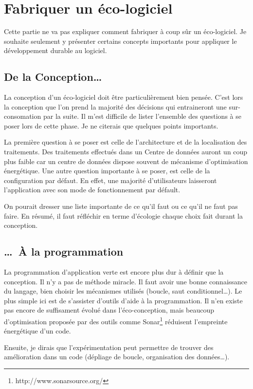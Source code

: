 \documentclass[a4paper, 11pt]{report}
\begin{document}
	\section{Fabriquer un éco-logiciel}
Cette partie ne va pas expliquer comment fabriquer à coup sûr un éco-logiciel. Je souhaite seulement y présenter certains concepts importants pour appliquer le développement durable au logiciel.
		\subsection{De la Conception\ldots}
La conception d'un éco-logiciel doit être particulièrement bien pensée. C'est lors la conception que l'on prend la majorité des décisions qui entraineront une sur-consomation par la suite. Il m'est difficile de lister l'ensemble des questions à se poser lors de cette phase. Je ne citerais que quelques points importants.

La première question à se poser est celle de l'architecture et de la localisation des traitements\cite{EcoLogiciels}. Des traitements effectués dans un Centre de données auront un coup plus faible car un centre de données dispose souvent de mécanisme d'optimisation énergétique. Une autre question importante à se poser, est celle de la configuration par défaut\cite{GreenPattern}. En effet, une majorité d'utilisateurs laisseront l'application avec son mode de fonctionnement par défault.

On pourait dresser une liste importante de ce qu'il faut ou ce qu'il ne faut pas faire. En résumé, il faut réfléchir en terme d'écologie chaque choix  fait durant la conception.

		\subsection{\ldots~À la programmation}
La programmation d'application \og verte \fg est encore plus dur à définir que la conception. Il n'y a pas de méthode miracle. Il faut avoir une bonne connaissance du langage, bien choisir les mécanismes utilisés (boucle, saut conditionnel\ldots). Le plus simple ici est de s'assister d'outils d'aide à la programmation. Il n'en existe pas encore de suffisament évolué dans l'éco-conception, mais beaucoup d'optimisation proposée par des outils comme Sonar\footnote{http://www.sonarsource.org/} réduisent l'empreinte énergétique d'un code.

Ensuite, je dirais que l'expérimentation peut permettre de trouver des amélioration dans un code (dépliage de boucle, organisation des données\ldots).
\end{document}
